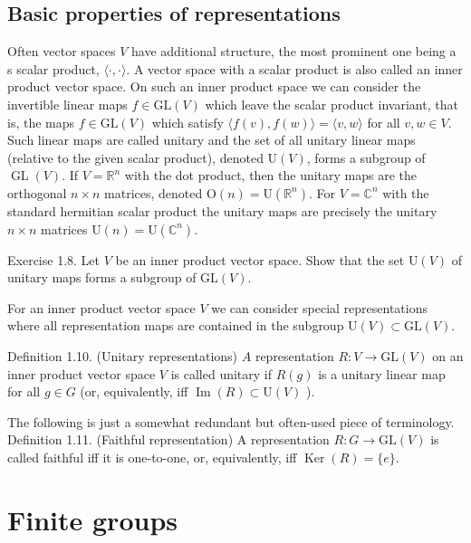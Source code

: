 \subsection*{Basic properties of representations}

Often vector spaces $V$ have additional structure, the most prominent one being a s scalar product, $\langle\cdot, \cdot\rangle$. A vector space with a scalar product is also called an inner product vector space. On such an inner product space we can consider the invertible linear maps $f \in \mathrm{GL}(V)$ which leave the scalar product invariant, that is, the maps $f \in \mathrm{GL}(V)$ which satisfy $\langle f(v), f(w)\rangle=\langle v, w\rangle$ for all $v, w \in V$. Such linear maps are called unitary and the set of all unitary linear maps (relative to the given scalar product), denoted $\mathrm{U}(V)$, forms a subgroup of $\operatorname{GL}(V)$. If $V=\mathbb{R}^{n}$ with the dot product, then the unitary maps are the orthogonal $n \times n$ matrices, denoted $\mathrm{O}(n)=\mathrm{U}\left(\mathbb{R}^{n}\right)$. For $V=\mathbb{C}^{n}$ with the standard hermitian scalar product the unitary maps are precisely the unitary $n \times n$ matrices $\mathrm{U}(n)=\mathrm{U}\left(\mathbb{C}^{n}\right)$.

Exercise 1.8. Let $V$ be an inner product vector space. Show that the set $\mathrm{U}(V)$ of unitary maps forms a subgroup of $\mathrm{GL}(V)$.

For an inner product vector space $V$ we can consider special representations where all representation maps are contained in the subgroup $\mathrm{U}(V) \subset \mathrm{GL}(V)$.

Definition 1.10. (Unitary representations) $A$ representation $R: V \rightarrow \mathrm{GL}(V)$ on an inner product vector space $V$ is called unitary if $R(g)$ is a unitary linear map for all $g \in G$ (or, equivalently, iff $\operatorname{Im}(R) \subset \mathrm{U}(V)$ ).

The following is just a somewhat redundant but often-used piece of terminology.
Definition 1.11. (Faithful representation) A representation $R: G \rightarrow \mathrm{GL}(V)$ is called faithful iff it is one-to-one, or, equivalently, iff $\operatorname{Ker}(R)=\{e\}$.


\section{Finite groups}

